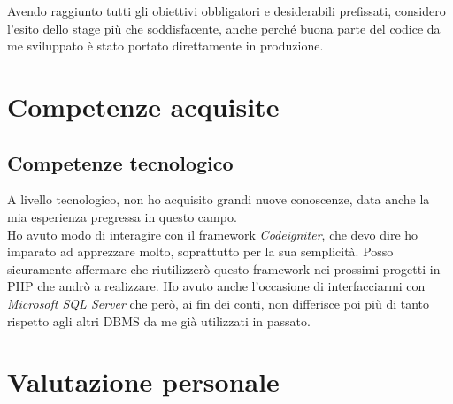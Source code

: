 Avendo raggiunto tutti gli obiettivi obbligatori e desiderabili prefissati, considero l'esito dello stage più che soddisfacente, anche perché buona parte del codice da me sviluppato è stato portato direttamente in produzione.
\section{Competenze acquisite}
\subsection{Competenze tecnologico}
A livello tecnologico, non ho acquisito grandi nuove conoscenze, data anche la mia esperienza pregressa in questo campo.\\ Ho avuto modo di interagire con il framework \textit{Codeigniter}, che devo dire ho imparato ad apprezzare molto, soprattutto per la sua semplicità. Posso sicuramente affermare che riutilizzerò questo framework nei prossimi progetti in PHP che andrò a realizzare. Ho avuto anche l'occasione di interfacciarmi con \textit{Microsoft SQL Server} che però, ai fin dei conti, non differisce poi più di tanto rispetto agli altri \gls{DBMS} da me già utilizzati in passato.
\section{Valutazione personale}

